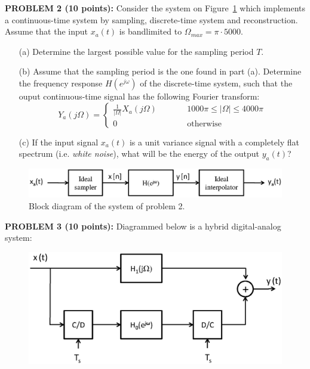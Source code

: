 \documentclass[a4paper,11pt,oneside]{article}
\begin{document}
\noindent \textbf{PROBLEM 2 (10 points):}  Consider the system on Figure~\ref{fig2} which implements a continuous-time system by sampling, discrete-time system and reconstruction. Assume that the input $x_a(t)$ is bandlimited to $\Omega_{max}=\pi\cdot 5000$. 

\begin{itemize}
\item[(a)] Determine the largest possible value for the sampling period $T$.
\item[(b)] Assume that the sampling period is the one found in part (a). Determine the frequency response $H(e^{j\omega})$ of the discrete-time system, such that the ouput continuous-time signal has the following Fourier transform:
\[
Y_{a}(j\Omega)=\left\{\begin{array}{lll}
\frac{1}{|\Omega|}X_a(j\Omega) & \qquad & 1000\pi \leq |\Omega| \leq 4000\pi\\
0 & \qquad & \textrm{otherwise}
\end{array}\right. 
\]

\item[(c)] If the input signal $x_a(t)$ is a unit variance signal with a completely flat spectrum (i.e. \emph{white noise}), what will be the energy of the output $y_a(t)$?
\end{itemize}


\begin{figure}[h!]
\centering
\includegraphics[width=.8\textwidth]{fig2.eps}
\caption{Block diagram of the system of problem 2.}
\label{fig2}
\end{figure}

\vspace{2cm}


\textbf{PROBLEM 3 (10 points):} Diagrammed below is a hybrid digital-analog system:

\begin{figure}[h!]
\centering
\includegraphics[width=.8\textwidth]{fig4.eps}
\end{figure} 
\end{document}
